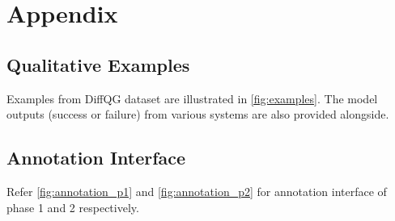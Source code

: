 \section{Appendix}

\subsection{Qualitative Examples}
\label{sec:appendix:failure}
Examples from DiffQG dataset are illustrated in \autoref{fig:examples}. The model outputs (success or failure) from various systems are also provided alongside. 


\subsection{Annotation Interface}
\label{sec:interface}
Refer \autoref{fig:annotation_p1} and \autoref{fig:annotation_p2} for annotation interface of phase 1 and 2 respectively.





% 



